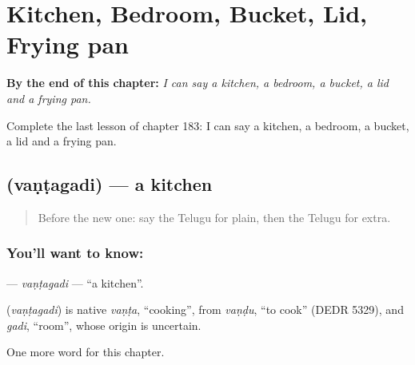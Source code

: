 
\chapter{Kitchen, Bedroom, Bucket, Lid, Frying pan}
\label{ch:te-kitchen-bedroom-bucket-lid-frying-pan}

\begin{chapteropening}
\textbf{By the end of this chapter:} \emph{I can say a kitchen, a bedroom, a bucket, a lid and a frying pan.}

Complete the last lesson of chapter 183: I can say a kitchen, a bedroom, a bucket, a lid and a frying pan.
\end{chapteropening}

\section[\texorpdfstring{\te{వంటగది} (vaṇṭagadi)}{వంటగది (vaṇṭagadi)}]{ (vaṇṭagadi) — a kitchen}

\label{lesson:TE-C183-vantagadi}



\begin{quote}
Before the new one: say the Telugu for plain, then the Telugu for extra.
\end{quote}

\subsection*{You'll want to know: }
\textbf{} — \emph{vaṇṭagadi} — \textquotedblleft{}a kitchen\textquotedblright{}.

\begin{cousinweb}
\textbf{} (\emph{vaṇṭagadi}) is native \emph{vaṇṭa}, \textquotedblleft{}cooking\textquotedblright{}, from \emph{vaṇḍu}, \textquotedblleft{}to cook\textquotedblright{} (DEDR 5329), and \emph{gadi}, \textquotedblleft{}room\textquotedblright{}, whose origin is uncertain.
\end{cousinweb}

\begin{grammarlens}[title={What you've built}]
One more word for this chapter.
\end{grammarlens}

